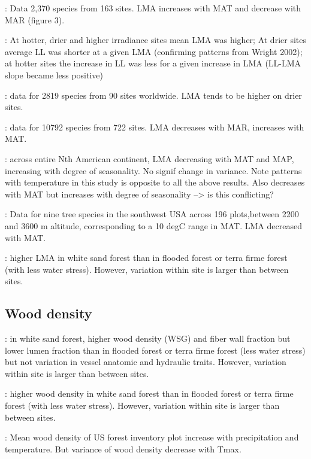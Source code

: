 \documentclass[a4paper,11pt]{article}
\begin{document}
\citet{Wright-2004}: Data 2,370 species from 163 sites. LMA increases with MAT and decrease with MAR (figure 3).

\citet{Wright-2005}: At hotter, drier and higher irradiance sites mean LMA was higher; At drier sites average LL was shorter at a given LMA (confirming patterns from Wright 2002); at hotter sites the increase in LL was less for a given increase in LMA (LL-LMA slope became less positive)

\citet{Onoda-2011}: data for 2819 species from 90 sites worldwide. LMA tends to be higher on drier sites.

\citet{Moles-2014}: data for 10792 species from 722 sites. LMA decreases with MAR, increases with MAT.

\citet{Simova-2014}: across entire Nth American continent, LMA decreasing with MAT and MAP, increasing with degree of seasonality. No signif change in variance. Note patterns with temperature in this study is opposite to all the above results. Also decreases with MAT but increases with degree of seasonality --> is this conflicting?

\citet{Laughlin-2012}: Data for nine tree species in the southwest USA across 196 plots,between 2200 and 3600 m altitude, corresponding to a 10 degC range in MAT. LMA decreased with MAT.


\citet{Fortunel 2014}: higher LMA  in white sand forest than in flooded forest or terra firme forest (with less water stress). However, variation within site is larger than between sites.


\subsection{Wood density}

\citet{Fortunel 2014}: in white sand forest, higher wood density (WSG) and fiber wall fraction but lower lumen fraction than in flooded forest or terra firme forest (less water stress) but not variation in vessel anatomic and hydraulic traits. However, variation within site is larger than between sites.

\citet{Fortunel 2014}: higher wood density in white sand forest than in flooded forest or terra firme forest (with less water stress). However, variation within site is larger than between sites.

\citet{Swenson-2010}: Mean wood density of US forest inventory plot increase with precipitation and temperature. But variance of wood density decrease with Tmax.
\end{document}

